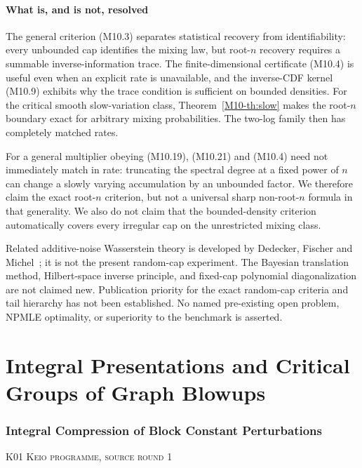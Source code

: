 \documentclass[11pt,a4paper]{article}
\theoremstyle{definition}\newtheorem{definition}[theorem]{Definition}
\theoremstyle{remark}\newtheorem{remark}[theorem]{Remark}
\numberwithin{equation}{section}
\begin{document}
\subsection{What is, and is not, resolved}\label{M10-sec-7}
The general criterion (M10.3) separates statistical recovery from identifiability: every unbounded cap identifies the mixing law, but root-$n$ recovery requires a summable inverse-information trace. The finite-dimensional certificate (M10.4) is useful even when an explicit rate is unavailable, and the inverse-CDF kernel (M10.9) exhibits why the trace condition is sufficient on bounded densities. For the critical smooth slow-variation class, Theorem~\ref{M10-th:slow} makes the root-$n$ boundary exact for arbitrary mixing probabilities. The two-log family then has completely matched rates.

For a general multiplier obeying (M10.19), (M10.21) and (M10.4) need not immediately match in rate: truncating the spectral degree at a fixed power of $n$ can change a slowly varying accumulation by an unbounded factor. We therefore claim the exact root-$n$ criterion, but not a universal sharp non-root-$n$ formula in that generality. We also do not claim that the bounded-density criterion automatically covers every irregular cap on the unrestricted mixing class.

Related additive-noise Wasserstein theory is developed by Dedecker, Fischer and Michel~\cite{ref027}; it is not the present random-cap experiment. The Bayesian translation method, Hilbert-space inverse principle, and fixed-cap polynomial diagonalization are not claimed new. Publication priority for the exact random-cap criteria and tail hierarchy has not been established. No named pre-existing open problem, NPMLE optimality, or superiority to the benchmark is asserted.





\clearpage
\part{Integral Presentations and Critical Groups of Graph Blowups}


\clearpage
\section[K01 --- Integral Compression of Block Constant Perturbations]{Integral Compression of Block Constant Perturbations}\label{contrib-K01}
\noindent\textsc{K01 \quad Keio programme, source round 1}\par\medskip
\end{document}
